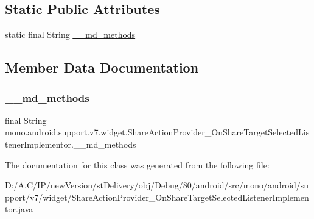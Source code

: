 \subsection*{Static Public Attributes}
\begin{DoxyCompactItemize}
\item 
static final String \hyperlink{classmono_1_1android_1_1support_1_1v7_1_1widget_1_1_share_action_provider___on_share_target_selected_listener_implementor_a32a6cc09bf050bf79d6e842469167e17}{\+\_\+\+\_\+md\+\_\+methods}
\end{DoxyCompactItemize}


\subsection{Member Data Documentation}
\mbox{\label{classmono_1_1android_1_1support_1_1v7_1_1widget_1_1_share_action_provider___on_share_target_selected_listener_implementor_a32a6cc09bf050bf79d6e842469167e17}} 
\subsubsection{\texorpdfstring{\+\_\+\+\_\+md\+\_\+methods}{\_\_md\_methods}}
{\footnotesize\ttfamily final String mono.\+android.\+support.\+v7.\+widget.\+Share\+Action\+Provider\+\_\+\+On\+Share\+Target\+Selected\+Listener\+Implementor.\+\_\+\+\_\+md\+\_\+methods\hspace{0.3cm}{\ttfamily [static]}}



The documentation for this class was generated from the following file\+:\begin{DoxyCompactItemize}
\item 
D\+:/\+A.\+C/\+I\+P/new\+Version/st\+Delivery/obj/\+Debug/80/android/src/mono/android/support/v7/widget/Share\+Action\+Provider\+\_\+\+On\+Share\+Target\+Selected\+Listener\+Implementor.\+java\end{DoxyCompactItemize}
